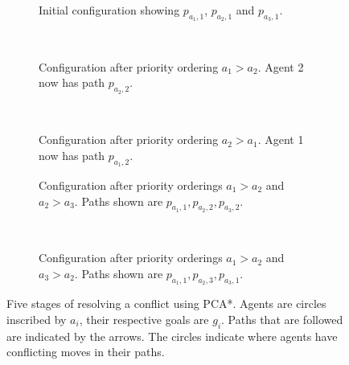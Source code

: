 \begin{figure}[t]
    \centering
    \begin{subfigure}[t]{.3\textwidth}
        \centering
        \def\svgscale{.6}
        
        \caption{Initial configuration showing $p_{a_1,1}$, $p_{a_2,1}$ and 
            $p_{a_3,1}$.}
        \label{fig:pca-initial}
    \end{subfigure}
    ~
    \begin{subfigure}[t]{.3\textwidth}
        \centering
        \def\svgscale{.6}
        
        \caption{Configuration after priority ordering $a_1 > a_2$. Agent 2 now 
            has path $p_{a_2,2}$.}
        \label{fig:pca-2}
    \end{subfigure}
    ~
    \begin{subfigure}[t]{.3\textwidth}
        \centering
        \def\svgscale{.6}
        
        \caption{Configuration after priority ordering $a_2 > a_1$. Agent 1 now 
            has path $p_{a_1,2}$.}
        \label{fig:pca-3}
    \end{subfigure}
    
    \begin{subfigure}[t]{.4\textwidth}
        \centering
        \def\svgscale{.6}
        
        \caption{Configuration after priority orderings $a_1 > a_2$ and $a_2 > 
            a_3$. Paths shown are $p_{a_1,1}, p_{a_2,2}, p_{a_3,2}$.}
        \label{fig:pca-4}
    \end{subfigure}
    ~
    \begin{subfigure}[t]{.4\textwidth}
        \centering
        \def\svgscale{.6}
        
        \caption{Configuration after priority orderings $a_1 > a_2$ and $a_3 > 
            a_2$. Paths shown are $p_{a_1,1}, p_{a_2,3}, p_{a_3,1}$.}
        \label{fig:pca-5}
    \end{subfigure}
    
    \caption{Five stages of resolving a conflict using PCA*. Agents are circles
        inscribed by $a_i$, their respective goals are $g_i$. Paths that are 
        followed are indicated by the arrows. The circles indicate where agents 
        have conflicting moves in their paths.}
    \label{fig:pca-example}
\end{figure}

